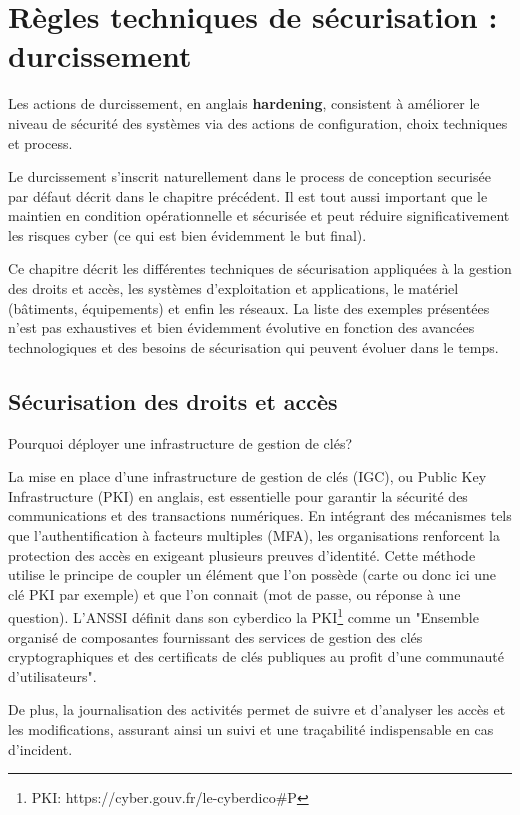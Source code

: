 \section{Règles techniques de sécurisation : durcissement}

Les actions de durcissement, en anglais \textbf{hardening}, consistent à améliorer le niveau de sécurité des systèmes via des actions de configuration, choix techniques et process.

Le durcissement s'inscrit naturellement dans le process de conception securisée par défaut décrit dans le chapitre précédent. Il est tout aussi important que le maintien en condition opérationnelle et sécurisée et peut réduire significativement les risques cyber (ce qui est bien évidemment le but final).

Ce chapitre décrit les différentes techniques de sécurisation appliquées à la gestion des droits et accès, les systèmes d'exploitation et applications, le matériel (bâtiments, équipements) et enfin les réseaux.
La liste des exemples présentées n'est pas exhaustives et bien évidemment évolutive en fonction des avancées technologiques et des besoins de sécurisation qui peuvent évoluer dans le temps.

\subsection{Sécurisation des droits et accès} 

Pourquoi déployer une infrastructure de gestion de clés?

La mise en place d'une infrastructure de gestion de clés (IGC), ou Public Key Infrastructure (PKI) en anglais, est essentielle pour garantir la sécurité des communications et des transactions numériques. En intégrant des mécanismes tels que l'authentification à facteurs multiples (MFA), les organisations renforcent la protection des accès en exigeant plusieurs preuves d'identité. Cette méthode utilise le principe de coupler un élément que l'on possède (carte ou donc ici une clé PKI par exemple) et que l'on connait (mot de passe, ou réponse à une question).
L'ANSSI définit dans son cyberdico la PKI\footnote{PKI: https://cyber.gouv.fr/le-cyberdico\#P} comme un "Ensemble organisé de composantes fournissant des services de gestion des clés cryptographiques et des certificats de clés publiques au profit d’une communauté d’utilisateurs". 

De plus, la journalisation des activités permet de suivre et d'analyser les accès et les modifications, assurant ainsi un suivi et une traçabilité indispensable en cas d'incident. 

